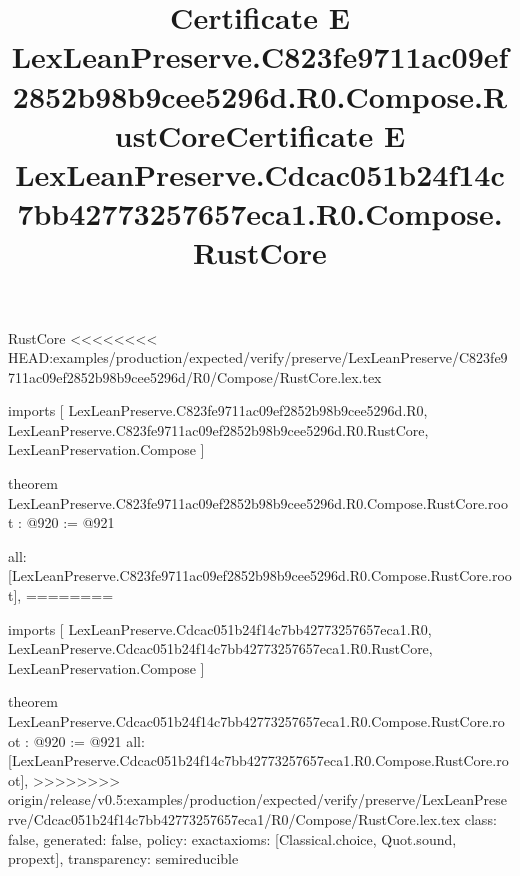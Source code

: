 \begin{lexlean}{RustCore}
<<<<<<<< HEAD:examples/production/expected/verify/preserve/LexLeanPreserve/C823fe9711ac09ef2852b98b9cee5296d/R0/Compose/RustCore.lex.tex
\title{Certificate E LexLeanPreserve.C823fe9711ac09ef2852b98b9cee5296d.R0.Compose.RustCore}
\begin{coremodule}
imports [
  LexLeanPreserve.C823fe9711ac09ef2852b98b9cee5296d.R0,
  LexLeanPreserve.C823fe9711ac09ef2852b98b9cee5296d.R0.RustCore,
  LexLeanPreservation.Compose
]

theorem LexLeanPreserve.C823fe9711ac09ef2852b98b9cee5296d.R0.Compose.RustCore.root : @920 := @921 {
  all: [LexLeanPreserve.C823fe9711ac09ef2852b98b9cee5296d.R0.Compose.RustCore.root],
========
\title{Certificate E LexLeanPreserve.Cdcac051b24f14c7bb42773257657eca1.R0.Compose.RustCore}
\begin{coremodule}
imports [
  LexLeanPreserve.Cdcac051b24f14c7bb42773257657eca1.R0,
  LexLeanPreserve.Cdcac051b24f14c7bb42773257657eca1.R0.RustCore,
  LexLeanPreservation.Compose
]

theorem LexLeanPreserve.Cdcac051b24f14c7bb42773257657eca1.R0.Compose.RustCore.root : @920 := @921 {
  all: [LexLeanPreserve.Cdcac051b24f14c7bb42773257657eca1.R0.Compose.RustCore.root],
>>>>>>>> origin/release/v0.5:examples/production/expected/verify/preserve/LexLeanPreserve/Cdcac051b24f14c7bb42773257657eca1/R0/Compose/RustCore.lex.tex
  class: false,
  generated: false,
  policy: exact{axioms: [Classical.choice, Quot.sound, propext]},
  transparency: semireducible
}


\end{coremodule}}
\end{coremodule}
\end{lexlean}
